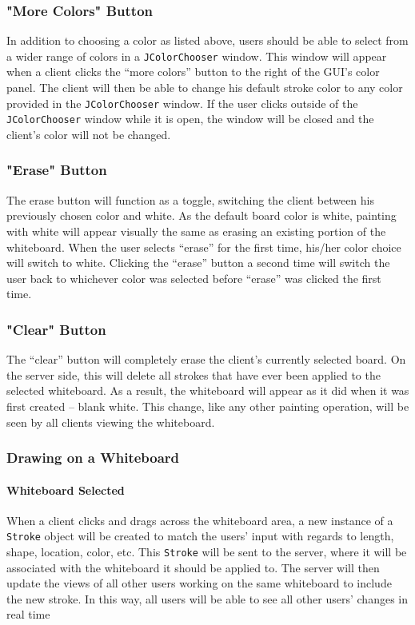 \subsubsection{"More Colors" Button}
In addition to choosing a color as listed above, users should be able to select from a wider range of colors in a \texttt{JColorChooser} window. This window will appear when a client clicks the “more colors” button to the right of the GUI’s color panel. The client will then be able to change his default stroke color to any color provided in the \texttt{JColorChooser} window. If the user clicks outside of the \texttt{JColorChooser} window while it is open, the window will be closed and the client’s color will not be changed.

\subsubsection{"Erase" Button}
The erase button will function as a toggle, switching the client between his previously chosen color and white. As the default board color is white, painting with white will appear visually the same as erasing an existing portion of the whiteboard. When the user selects “erase” for the first time, his/her color choice will switch to white.  Clicking the “erase” button a second time will switch the user back to whichever color was selected before “erase” was clicked the first time.

\subsubsection{"Clear" Button}
The “clear” button will completely erase the client’s currently selected board.  On the server side, this will delete all strokes that have ever been applied to the selected whiteboard. As a result, the whiteboard will appear as it did when it was first created – blank white. This change, like any other painting operation, will be seen by all clients viewing the whiteboard.

\subsubsection{Drawing on a Whiteboard}

\paragraph{Whiteboard Selected}
When a client clicks and drags across the whiteboard area, a new instance of a \texttt{Stroke} object will be created to match the users’ input with regards to length, shape, location, color, etc.  This \texttt{Stroke} will be sent to the server, where it will be associated with the whiteboard it should be applied to. The server will then update the views of all other users working on the same whiteboard to include the new stroke.  In this way, all users will be able to see all other users’ changes in real time


